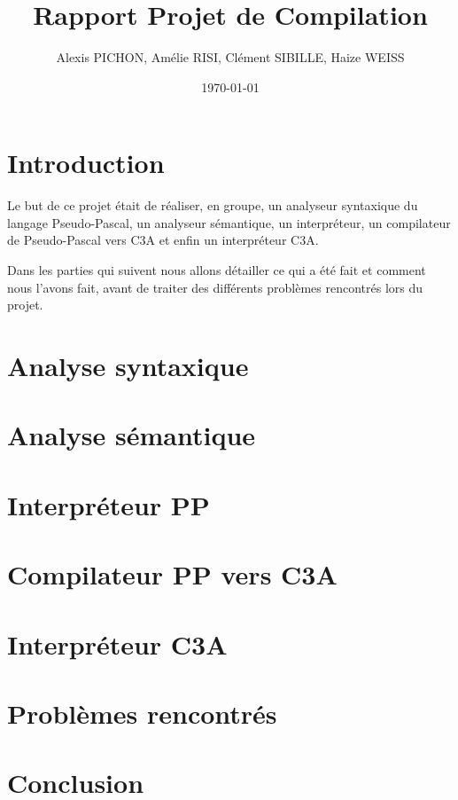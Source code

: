 \documentclass[11pt,a4paper]{article}
\title{Rapport Projet de Compilation}
\author{Alexis PICHON, Amélie RISI, Clément SIBILLE, Haize WEISS}
\date{\today}
\begin{document}
\maketitle
\tableofcontents
\pagebreak

\setlength{\parskip}{1em}
\setlength{\intextsep}{2em}


\section{Introduction}
Le but de ce projet était de réaliser, en groupe, un analyseur syntaxique du langage Pseudo-Pascal, un analyseur sémantique, un interpréteur, un compilateur de Pseudo-Pascal vers C3A et enfin un interpréteur C3A.
\par
Dans les parties qui suivent nous allons détailler ce qui a été fait et comment nous l'avons fait, avant de traiter des différents problèmes rencontrés lors du projet.
\section{Analyse syntaxique}
\section{Analyse sémantique}
\section{Interpréteur PP}
\section{Compilateur PP vers C3A}
\section{Interpréteur C3A}
\section{Problèmes rencontrés}
\section{Conclusion}
\end{document}
